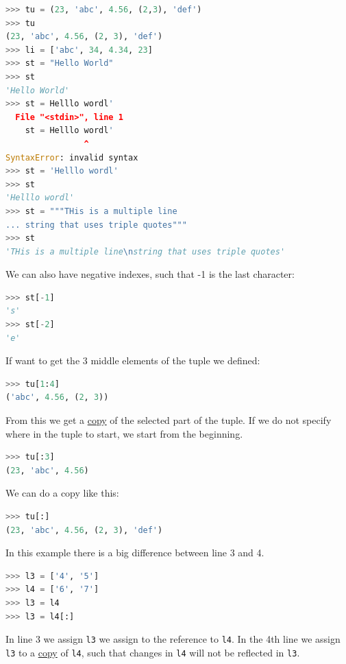 \documentclass{article}
\begin{document}
\begin{lstlisting}[inputencoding=utf8/latin1,basicstyle=\ttfamily,
language=python, keywordstyle=\color{blue}\bfseries, rulecolor=\color{black}]
>>> tu = (23, 'abc', 4.56, (2,3), 'def')
>>> tu
(23, 'abc', 4.56, (2, 3), 'def')
>>> li = ['abc', 34, 4.34, 23]
>>> st = "Hello World"
>>> st
'Hello World'
>>> st = Helllo wordl'
  File "<stdin>", line 1
    st = Helllo wordl'
                ^
SyntaxError: invalid syntax
>>> st = 'Helllo wordl'
>>> st
'Helllo wordl'
>>> st = """THis is a multiple line
... string that uses triple quotes"""
>>> st
'THis is a multiple line\nstring that uses triple quotes'
\end{lstlisting}
We can also have negative indexes, such that -1 is the last character:
\begin{lstlisting}[inputencoding=utf8/latin1,basicstyle=\ttfamily,
language=python, keywordstyle=\color{blue}\bfseries, rulecolor=\color{black}]
>>> st[-1]
's'
>>> st[-2]
'e'
\end{lstlisting}
If want to get the 3 middle elements of the tuple we defined:
\begin{lstlisting}[inputencoding=utf8/latin1,basicstyle=\ttfamily,
language=python, keywordstyle=\color{blue}\bfseries, rulecolor=\color{black}]
>>> tu[1:4]
('abc', 4.56, (2, 3))
\end{lstlisting}
From this we get a \underline{copy} of the selected part of the tuple. If we do
not specify where in the tuple to start, we start from the beginning.
\begin{lstlisting}[inputencoding=utf8/latin1,basicstyle=\ttfamily,
language=python, keywordstyle=\color{blue}\bfseries, rulecolor=\color{black}]
>>> tu[:3]
(23, 'abc', 4.56)
\end{lstlisting}
We can do a copy like this:
\begin{lstlisting}[inputencoding=utf8/latin1,basicstyle=\ttfamily,
language=python, keywordstyle=\color{blue}\bfseries, rulecolor=\color{black}]
>>> tu[:]
(23, 'abc', 4.56, (2, 3), 'def')
\end{lstlisting}

In this example there is a big difference between line 3 and 4.
\begin{lstlisting}[inputencoding=utf8/latin1,basicstyle=\ttfamily,
language=python, keywordstyle=\color{blue}\bfseries, rulecolor=\color{black}]
>>> l3 = ['4', '5']
>>> l4 = ['6', '7']
>>> l3 = l4
>>> l3 = l4[:]
\end{lstlisting}
In line 3 we assign \texttt{l3} we assign to the reference to \texttt{l4}. In
the 4th line we assign \texttt{l3} to a \underline{copy} of \texttt{l4}, such
that changes in \texttt{l4} will not be reflected in \texttt{l3}.
\end{document}
